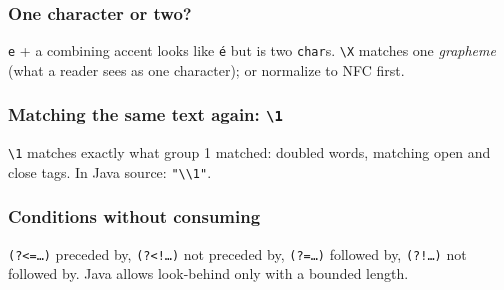 \documentclass[aspectratio=169,10pt,compress]{beamer}
\begin{document}
\begin{frame}[t,fragile] \frametitle{One character or two?}

  \vspace{0.2em}
  \small \texttt{e} + a combining accent looks like \texttt{é} but is two \texttt{char}s. \texttt{\textbackslash X} matches one \emph{grapheme} (what a reader sees as one character); or normalize to NFC first.
\end{frame}





\begin{frame}[t,fragile] \frametitle{Matching the same text again: \texttt{\textbackslash 1}}

  \vspace{0.2em}
  \small \texttt{\textbackslash 1} matches exactly what group 1 matched: doubled words, matching open and close tags. In Java source: \texttt{"\textbackslash\textbackslash 1"}.
\end{frame}





\begin{frame}[t,fragile] \frametitle{Conditions without consuming}

  \vspace{0.2em}
  \small \texttt{(?<=\dots)} preceded by, \texttt{(?<!\dots)} not preceded by, \texttt{(?=\dots)} followed by, \texttt{(?!\dots)} not followed by.
  Java allows look-behind only with a bounded length.
\end{frame}
\end{document}

